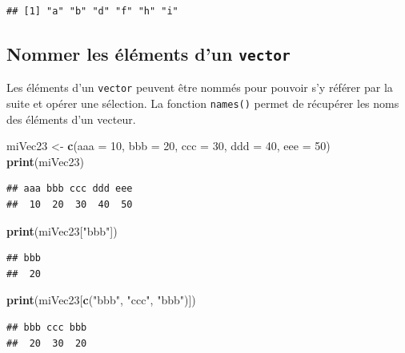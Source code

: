 \documentclass[
]{book}
\newenvironment{Shaded}{\begin{snugshade}}{\end{snugshade}}
\newcommand{\DataTypeTok}[1]{\textcolor[rgb]{0.13,0.29,0.53}{#1}}
\newcommand{\DecValTok}[1]{\textcolor[rgb]{0.00,0.00,0.81}{#1}}
\newcommand{\KeywordTok}[1]{\textcolor[rgb]{0.13,0.29,0.53}{\textbf{#1}}}
\newcommand{\NormalTok}[1]{#1}
\newcommand{\StringTok}[1]{\textcolor[rgb]{0.31,0.60,0.02}{#1}}
\begin{document}
\begin{verbatim}
## [1] "a" "b" "d" "f" "h" "i"
\end{verbatim}

\hypertarget{nommer-les-uxe9luxe9ments-dun-vector}{%
\subsection{\texorpdfstring{Nommer les éléments d'un \texttt{vector}}{Nommer les éléments d'un vector}}\label{nommer-les-uxe9luxe9ments-dun-vector}}

Les éléments d'un \texttt{vector} peuvent être nommés pour pouvoir s'y référer par la suite et opérer une sélection. La fonction \texttt{names()} permet de récupérer les noms des éléments d'un vecteur.

\begin{Shaded}
\begin{Highlighting}[]
\NormalTok{miVec23 <-}\StringTok{ }\KeywordTok{c}\NormalTok{(}\DataTypeTok{aaa =} \DecValTok{10}\NormalTok{, }\DataTypeTok{bbb =} \DecValTok{20}\NormalTok{, }\DataTypeTok{ccc =} \DecValTok{30}\NormalTok{, }\DataTypeTok{ddd =} \DecValTok{40}\NormalTok{, }\DataTypeTok{eee =} \DecValTok{50}\NormalTok{)}
\KeywordTok{print}\NormalTok{(miVec23)}
\end{Highlighting}
\end{Shaded}

\begin{verbatim}
## aaa bbb ccc ddd eee 
##  10  20  30  40  50
\end{verbatim}

\begin{Shaded}
\begin{Highlighting}[]
\KeywordTok{print}\NormalTok{(miVec23[}\StringTok{"bbb"}\NormalTok{])}
\end{Highlighting}
\end{Shaded}

\begin{verbatim}
## bbb 
##  20
\end{verbatim}

\begin{Shaded}
\begin{Highlighting}[]
\KeywordTok{print}\NormalTok{(miVec23[}\KeywordTok{c}\NormalTok{(}\StringTok{"bbb"}\NormalTok{, }\StringTok{"ccc"}\NormalTok{, }\StringTok{"bbb"}\NormalTok{)])}
\end{Highlighting}
\end{Shaded}

\begin{verbatim}
## bbb ccc bbb 
##  20  30  20
\end{verbatim}
\end{document}
